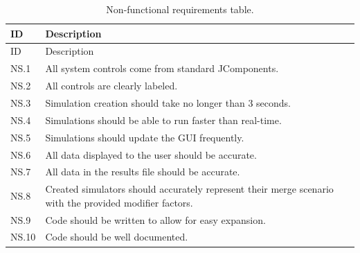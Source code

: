 \begin{longtable}{|p{0.1\linewidth}|p{0.9\linewidth}|}
\caption{Non-functional requirements table.}\label{tab:nonFunctionalRequirements}\\
\hline
ID & Description \\
\hline
\endfirsthead

\hline
ID & Description \\
\hline
\endhead

\hline
\endfoot

\hline
\endlastfoot

NS.1 & All system controls come from standard JComponents. \\
NS.2 & All controls are clearly labeled. \\
NS.3 & Simulation creation should take no longer than 3 seconds. \\
NS.4 & Simulations should be able to run faster than real-time. \\
NS.5 & Simulations should update the GUI frequently. \\
NS.6 & All data displayed to the user should be accurate. \\
NS.7 & All data in the results file should be accurate. \\
NS.8 & Created simulators should accurately represent their merge scenario with the provided modifier factors. \\
NS.9 & Code should be written to allow for easy expansion. \\
NS.10 & Code should be well documented. \\
\end{longtable}